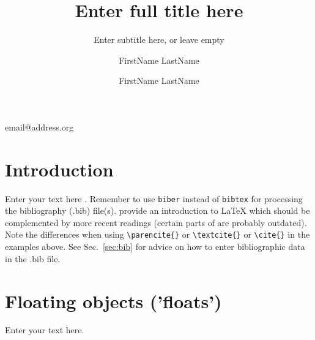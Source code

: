 \documentclass[british]{emisa}
\begin{document}
\lstset{language=TeX}
\begin{article}{%

\title[Insert shorttitle for headlines here]{Enter full title here}
\subtitle{Enter subtitle here, or leave empty}
\author*{FirstName LastName}{email@address.org}
\address{Enter affiliation of first and corresponding author here.  Note that only the starred version of author* accepts a second argument providing an email address for the corresponding author.}
\author{FirstName LastName}
\address{Enter affiliation of second author here. Add further authors following the source code scheme.}



}





\section{Introduction}
\label{intro}
Enter your text here \parencite{Mittelbach.2004}. Remember to use \texttt{biber} instead of \texttt{bibtex} for processing the bibliography (.bib) file(s). \textcite{Mittelbach.2004} provide an introduction to \LaTeX{} which should be complemented by more recent readings (\ie certain parts of \cite{Mittelbach.2004} are probably outdated). Note the differences when using \verb|\parencite{}| or \verb|\textcite{}| or \verb|\cite{}| in the examples above. See Sec.~\ref{sec:bib} for advice on how to enter bibliographic data in the .bib file.


\section{Floating objects ('floats')}\label{sec:1}
Enter your text here. 


\end{article}
\end{document}
